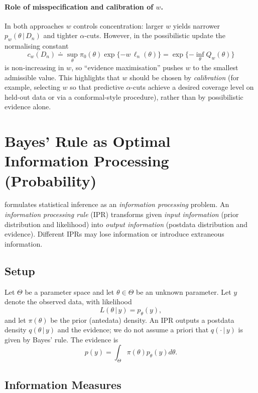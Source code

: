\documentclass[accepted]{uai2026} %
\def\given{\,|\,}
\theoremstyle{remark}
\begin{document}
\paragraph{Role of misspecification and calibration of $w$.}
In both approaches $w$ controls concentration: larger $w$ yields narrower $p_w(\theta\given D_n)$ and tighter $\alpha$-cuts. However, in the possibilistic update the normalising constant
\[
c_w(D_n) \doteq \sup_{\theta}\pi_0(\theta)\exp\{-w\,\ell_n(\theta)\}
= \exp\{-\inf_\theta Q_w(\theta)\}
\]
is non-increasing in $w$, so ``evidence maximisation'' pushes $w$ to the smallest admissible value. This highlights that $w$ should be chosen by \emph{calibration} (for example, selecting $w$ so that predictive $\alpha$-cuts achieve a desired coverage level on held-out data or via a conformal-style procedure), rather than by possibilistic evidence alone.



\section{Bayes' Rule as Optimal Information Processing (Probability)}
\label{app:optimal_information_processing}

\citet{zellner1988optimal} formulates statistical inference as an \emph{information processing} problem.
An \emph{information processing rule} (IPR) transforms given \emph{input information} (prior distribution and likelihood) into \emph{output information} (postdata distribution and evidence).
Different IPRs may lose information or introduce extraneous information.

\subsection*{Setup}

Let $\Theta$ be a parameter space and let $\theta\in\Theta$ be an unknown parameter. Let $y$ denote the observed data, with likelihood
\[
L(\theta\given y)=p_\theta(y),
\]
and let $\pi(\theta)$ be the prior (antedata) density. An IPR outputs a postdata density $q(\theta\given y)$ and the evidence; we do not assume a priori that $q(\cdot\given y)$ is given by Bayes' rule. The evidence is
\[
p(y)=\int_\Theta \pi(\theta)p_\theta(y)d\theta.
\]

\subsection*{Information Measures}
\end{document}
